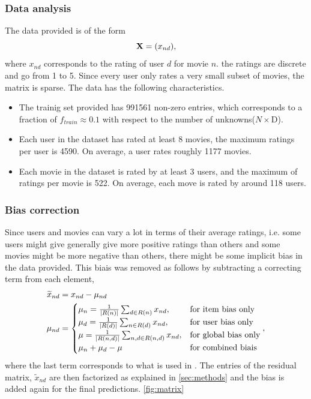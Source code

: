 \subsubsection{Data analysis}

The data provided is of the form 
\begin{equation}
  \mathbf{X} = (x_{nd}),
\end{equation}
where $x_{nd}$ corresponds to the rating of user $d$ for movie $n$.  
the ratings are discrete and go from 1 to 5. Since every user only rates a
very small subset of movies, the matrix is sparse. The data has the following
characteristics.

\begin{itemize}
  \item The trainig set provided has 991561 non-zero entries, which corresponds to 
a fraction of $f_{train} \approx 0.1$ with respect to the number of unknowns($N \times $D). 
  \item Each user in the dataset has rated at least 8 movies, the maximum
    ratings per user is 4590. On average, a user rates roughly 1177 movies.
  \item Each movie in the dataset is rated by at least 3 users, and the maximum
    of ratings per movie is 522. On average, each move is rated by around 118
    users. 
\end{itemize}

\subsubsection{Bias correction}
\label{sec:biascorrection}

Since users and movies can vary a lot in terms of their average ratings, i.e. some
users might give generally give more positive ratings than others and some
movies might be more negative than others, there might be some implicit bias in
the data provided. 
This biais was removed as follows by subtracting a correcting term from each
element,
\begin{align}
  \widetilde{x}_{nd} &= x_{nd}-\mu_{nd} \\
  \mu_{nd} &=
 \begin{cases}
  \mu_{n} = \frac{1}{|R(n)|} \sum_{d \in R(n)} x_{nd}, &\text{for item bias only}   \\
\mu_{d} = \frac{1}{|R(d)|} \sum_{n \in R(d)} x_{nd}, &\text{for user bias only} \\
\mu = \frac{1}{|R(n,d)|}\sum_{n,d \in R(n,d)} x_{nd}, &\text{for global bias only}
   \\
  \mu_{n} + \mu_{d} - \mu &\text{for combined biais}
 \end{cases}, 
\end{align}
where the last term corresponds to what is used in \cite{Koren2009}. 
The entries of the residual matrix, $\widetilde{x}_{nd}$ are then factorized as explained
in \ref{sec:methods} and the bias is added again for the final predictions.
\ref{fig:matrix}

